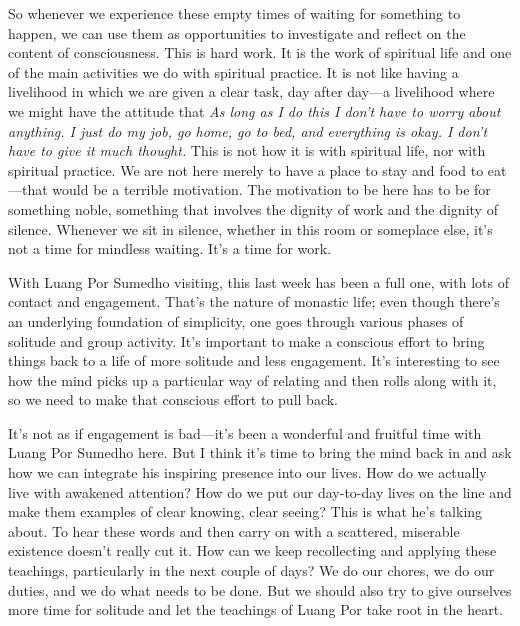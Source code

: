 So whenever we experience these empty times of waiting for something to 
happen, we can use them as opportunities to investigate and reflect on 
the content of consciousness. This is hard work. It is the work of 
spiritual life and one of the main activities we do with spiritual 
practice. It is not like having a livelihood in which we are given a 
clear task, day after day---a livelihood where we might have the 
attitude that \emph{As long as I do this I don't have to worry about 
anything. I just do my job, go home, go to bed, and everything is okay. 
I don't have to give it much thought.} This is not how it is with 
spiritual life, nor with spiritual practice. We are not here merely to 
have a place to stay and food to eat---that would be a terrible 
motivation. The motivation to be here has to be for something noble, 
something that involves the dignity of work and the dignity of silence. 
Whenever we sit in silence, whether in this room or someplace else, 
it's not a time for mindless waiting. It's a time for work.


With Luang Por Sumedho visiting, this last week has been a full one, 
with lots of contact and engagement. That's the nature of monastic 
life; even though there's an underlying foundation of simplicity, one 
goes through various phases of solitude and group activity. It's 
important to make a conscious effort to bring things back to a life of 
more solitude and less engagement. It's interesting to see how the mind 
picks up a particular way of relating and then rolls along with it, so 
we need to make that conscious effort to pull back.

It's not as if engagement is bad---it's been a wonderful and fruitful 
time with Luang Por Sumedho here. But I think it's time to bring the 
mind back in and ask how we can integrate his inspiring presence into 
our lives. How do we actually live with awakened attention? How do we 
put our day-to-day lives on the line and make them examples of clear 
knowing, clear seeing? This is what he's talking about. To hear these 
words and then carry on with a scattered, miserable existence doesn't 
really cut it. How can we keep recollecting and applying these 
teachings, particularly in the next couple of days? We do our chores, 
we do our duties, and we do what needs to be done. But we should also 
try to give ourselves more time for solitude and let the teachings of 
Luang Por take root in the heart.

